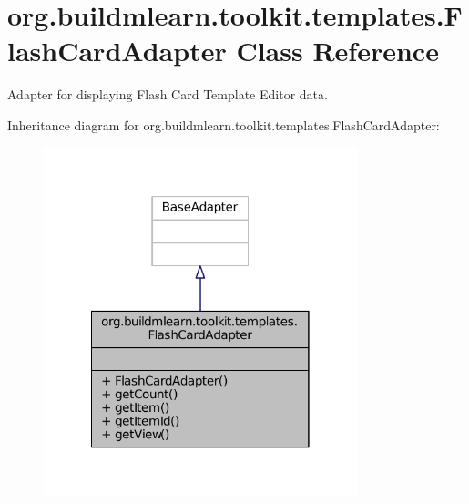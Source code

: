 \hypertarget{classorg_1_1buildmlearn_1_1toolkit_1_1templates_1_1FlashCardAdapter}{\section{org.\-buildmlearn.\-toolkit.\-templates.\-Flash\-Card\-Adapter Class Reference}
\label{classorg_1_1buildmlearn_1_1toolkit_1_1templates_1_1FlashCardAdapter}
}


Adapter for displaying Flash Card Template Editor data.  




Inheritance diagram for org.\-buildmlearn.\-toolkit.\-templates.\-Flash\-Card\-Adapter\-:
\nopagebreak
\begin{figure}[H]
\begin{center}
\leavevmode
\includegraphics[width=258pt]{d5/d23/classorg_1_1buildmlearn_1_1toolkit_1_1templates_1_1FlashCardAdapter__inherit__graph}
\end{center}
\end{figure}


